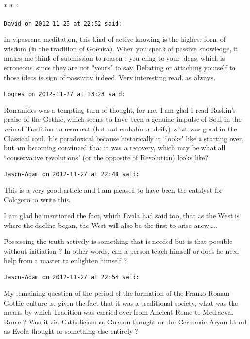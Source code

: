 \begin{center}* * *\end{center}

\begin{footnotesize}\begin{sffamily}



\texttt{David on 2012-11-26 at 22:52 said: }

In vipassana meditation, this kind of active knowing is the highest form of wisdom (in the tradition of Goenka). When you speak of passive knowledge, it makes me think of submission to reason : you cling to your ideas, which is erroneous, since they are not "yours" to say. Debating or attaching yourself to those ideas is sign of passivity indeed. Very interesting read, as always.


\hfill

\texttt{Logres on 2012-11-27 at 13:23 said: }

Romanides was a tempting turn of thought, for me. I am glad I read Ruskin's praise of the Gothic, which seems to have been a genuine impulse of Soul in the vein of Tradition to resurrect (but not embalm or deify) what was good in the Classical soul. It's paradoxical because historically it ``looks" like a starting over, but am becoming convinced that it was a recovery, which may be what all ``conservative revolutions" (or the opposite of Revolution) looks like?


\hfill

\texttt{Jason-Adam on 2012-11-27 at 22:48 said: }

This is a very good article and I am pleased to have been the catalyst for Cologero to write this.

I am glad he mentioned the fact, which Evola had said too, that as the West is where the decline began, the West will also be the first to arise anew…..

Possessing the truth actively is something that is needed but is that possible without initiation ? In other words, can a person teach himself or does he need help from a master to enlighten himself ?


\hfill

\texttt{Jason-Adam on 2012-11-27 at 22:54 said: }

My remaining question of the period of the formation of the Franko-Roman-Gothic culture is, given the fact that it was a traditional society, what was the means by which Tradition was carried over from Ancient Rome to Mediaeval Rome ? Was it via Catholicism as Guenon thought or the Germanic Aryan blood as Evola thought or something else entirely ?



\end{sffamily}
\end{footnotesize}
